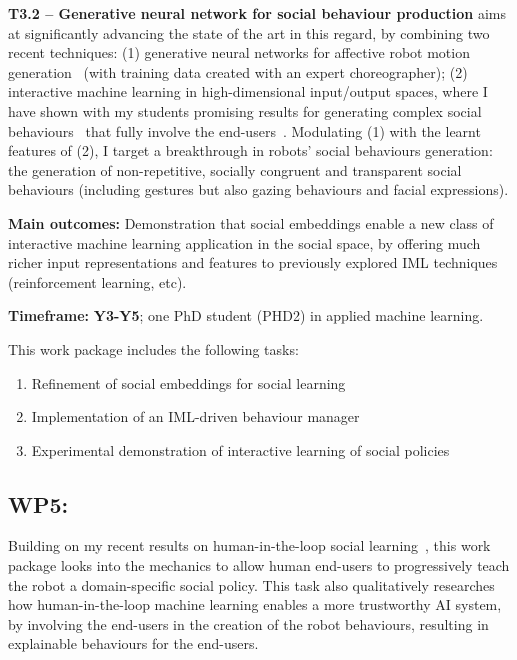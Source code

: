 \textbf{T3.2 -- Generative neural network for social behaviour production}
\project aims at significantly advancing the state of the art in this regard, by
combining two recent techniques: (1) generative neural networks for affective
robot motion generation~\cite{marmpena2019generating,suguitan2020moveae} (with
training data created with an expert choreographer); (2) interactive machine
learning in high-dimensional input/output spaces, where I have shown with my
students promising results for generating complex social
behaviours~\cite{senft2019teaching, winkle2020couch} that fully involve the
end-users~\cite{winkle2018social}. Modulating (1) with the learnt features of
(2), I target a breakthrough in robots' social behaviours generation: the
generation of non-repetitive, socially congruent and transparent social
behaviours (including gestures but also gazing behaviours and facial
expressions).

\begin{oframed}

    \textbf{Main outcomes:} Demonstration that social embeddings enable a new
    class of interactive machine learning application in the social space, by
    offering much richer input representations and features to previously
    explored IML techniques (reinforcement learning, etc).

    \textbf{Timeframe:} \textbf{Y3-Y5}; one PhD student (PHD2) in applied machine
    learning.

\end{oframed}

This work package includes the following tasks:

\begin{enumerate}[label=\textbf{T5.\arabic*}]
    \item{Refinement of social embeddings for social learning}
    \item{Implementation of an IML-driven behaviour manager}
    \item{Experimental demonstration of interactive learning of social policies}
\end{enumerate}

\subsection{WP5: \textbf{\wpFive}}

Building on my recent results on human-in-the-loop social
learning~\cite{senft2017supervised, senft2019teaching,
winkle2020couch,winkle2021leador}, this work package looks into the mechanics to
allow human end-users to progressively teach the robot a domain-specific social
policy.  This task also qualitatively researches how human-in-the-loop machine
learning enables a more trustworthy AI system, by involving the end-users in the
creation of the robot behaviours, resulting in explainable behaviours for the
end-users.


